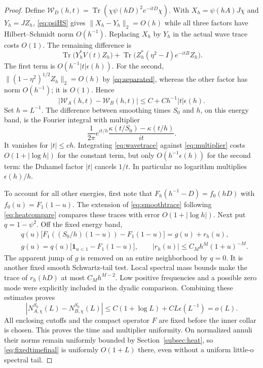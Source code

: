 \documentclass[11pt]{amsart}
\numberwithin{equation}{section}
\theoremstyle{remark}
\newcommand{\Tr}{\operatorname{Tr}}
\newcommand{\one}{\mathbf{1}}
\begin{document}
\begin{proof}
Define $\mathcal W_D(h,t)=\Tr(\chi\psi(hD)^2e^{-itD}\chi)$. With $X_h=\psi(hA)J\chi$ and $Y_h=JZ_h$, \eqref{eq:psiHS} gives $\|X_h-Y_h\|_2=O(h)$ while all three factors have Hilbert--Schmidt norm $O(h^{-1})$. Replacing $X_h$ by $Y_h$ in the actual wave trace costs $O(1)$. The remaining difference is
\begin{equation}\label{eq:wavediff}
\Tr\big(Y_h^*V(t)Z_h\big)+\Tr\big(Z_h^*(\eta^2-I)e^{-itB}Z_h\big) .
\end{equation}
The first term is $O(h^{-1}|t|\epsilon(h))$. For the second, $\|(1-\eta^2)^{1/2}Z_h\|_2=O(h)$ by \eqref{eq:separated}, whereas the other factor has norm $O(h^{-1})$; it is $O(1)$. Hence
\begin{equation}\label{eq:wavetrace}
|\mathcal W_A(h,t)-\mathcal W_B(h,t)|\le C+Ch^{-1}|t|\epsilon(h) .
\end{equation}
Set $h=L^{-1}$. The difference between smoothing times $S_0$ and $h$, on this energy band, is the Fourier integral with multiplier
\begin{equation}\label{eq:multiplier}
\frac1{2\pi}e^{it/h}\frac{\kappa(t/S_0)-\kappa(t/h)}{it} .
\end{equation}
It vanishes for $|t|\le ch$. Integrating \eqref{eq:wavetrace} against \eqref{eq:multiplier} costs $O(1+|\log h|)$ for the constant term, but only $O(h^{-1}\epsilon(h))$ for the second term: the Duhamel factor $|t|$ cancels $1/t$. In particular no logarithm multiplies $\epsilon(h)/h$.

To account for all other energies, first note that $F_h(h^{-1}-D)=f_0(hD)$ with $f_0(u)=F_1(1-u)$. The extension of \eqref{eq:smoothtrace} following \eqref{eq:heatcompare} compares these traces with error $O(1+|\log h|)$. Next put $q=1-\psi^2$. Off the fixed energy band,
\begin{equation}\label{eq:offband2}
\begin{aligned}
&q(u)\big[F_1((S_0/h)(1-u))-F_1(1-u)\big]=g(u)+r_h(u),\\
&g(u)=q(u)\big[\one_{u<1}-F_1(1-u)\big],\qquad |r_h(u)|\le C_Mh^M(1+u)^{-M} .
\end{aligned}
\end{equation}
The apparent jump of $g$ is removed on an entire neighborhood by $q=0$. It is another fixed smooth Schwartz-tail test. Local spectral mass bounds make the trace of $r_h(hD)$ at most $C_Mh^{M-2}$. Low positive frequencies and a possible zero mode were explicitly included in the dyadic comparison. Combining these estimates proves
\begin{equation}\label{eq:fixedtimefinal}
|N^{S_0}_{A,\chi}(L)-N^{S_0}_{B,\chi}(L)|\le C(1+\log L)+CL\epsilon(L^{-1})=o(L) .
\end{equation}
All enclosing cutoffs and the compact operator $F$ are fixed before the inner collar is chosen. This proves the time and multiplier uniformity. On normalized annuli their norms remain uniformly bounded by Section~\ref{subsec:heat}, so \eqref{eq:fixedtimefinal} is uniformly $O(1+L)$ there, even without a uniform little-o spectral tail.
\end{proof}
\end{document}
